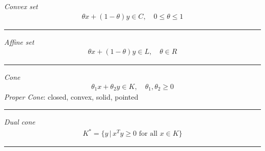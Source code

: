 \noindent
\textit{Convex set}
\begin{align*}
  \theta x + (1-\theta) y \in C, \quad 0 \le \theta \le 1
\end{align*}
\rule{\linewidth}{0.1mm}

\noindent
\textit{Affine set}
\begin{align*}
  \theta x + (1-\theta) y \in L, \quad \theta \in R
\end{align*}
\rule{\linewidth}{0.1mm}

\noindent
\textit{Cone}
\begin{align*}
  \theta_1 x + \theta_2 y \in K, \quad \theta_1, \theta_2 \ge 0
\end{align*}
\textit{Proper Cone}: closed, convex, solid, pointed\\
\rule{\linewidth}{0.1mm}

\noindent
\textit{Dual cone}
\begin{align*}
  K^* = \{y \, | \, x^T y \ge 0 \mbox{ for all } x \in K\}
\end{align*}
\rule{\linewidth}{0.1mm}





